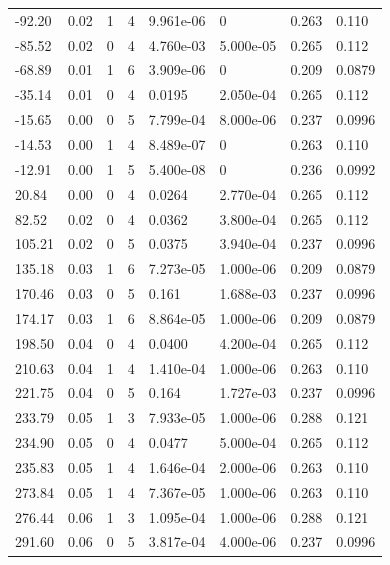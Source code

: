 \documentclass[preview]{standalone}
\begin{document}
{{\begin{tabular}{L{1.2cm}C{1.2cm} C{0.3cm}C{0.5cm} C{1.4cm}C{1.4cm} C{1.4cm}C{1.4cm}}
  -92.20  &  0.02  & 1     &  4 &  9.961e-06  & 0  & 0.263 &  0.110   \\ 
  -85.52  &  0.02  & 0     &  4 &  4.760e-03  & 5.000e-05  & 0.265 &  0.112   \\ 
  -68.89  &  0.01  & 1     &  6 &  3.909e-06  & 0  & 0.209 &  0.0879   \\ 
  -35.14  &  0.01  & 0     &  4 &  0.0195  & 2.050e-04  & 0.265 &  0.112   \\ 
  -15.65  &  0.00  & 0     &  5 &  7.799e-04  & 8.000e-06  & 0.237 &  0.0996   \\ 
  -14.53  &  0.00  & 1     &  4 &  8.489e-07  & 0  & 0.263 &  0.110   \\ 
  -12.91  &  0.00  & 1     &  5 &  5.400e-08  & 0  & 0.236 &  0.0992   \\ 
  20.84  &  0.00  & 0     &  4 &  0.0264  & 2.770e-04  & 0.265 &  0.112   \\ 
  82.52  &  0.02  & 0     &  4 &  0.0362  & 3.800e-04  & 0.265 &  0.112   \\ 
  105.21  &  0.02  & 0     &  5 &  0.0375  & 3.940e-04  & 0.237 &  0.0996   \\ 
  135.18  &  0.03  & 1     &  6 &  7.273e-05  & 1.000e-06  & 0.209 &  0.0879   \\ 
  170.46  &  0.03  & 0     &  5 &  0.161  & 1.688e-03  & 0.237 &  0.0996   \\ 
  174.17  &  0.03  & 1     &  6 &  8.864e-05  & 1.000e-06  & 0.209 &  0.0879   \\ 
  198.50  &  0.04  & 0     &  4 &  0.0400  & 4.200e-04  & 0.265 &  0.112   \\ 
  210.63  &  0.04  & 1     &  4 &  1.410e-04  & 1.000e-06  & 0.263 &  0.110   \\ 
  221.75  &  0.04  & 0     &  5 &  0.164  & 1.727e-03  & 0.237 &  0.0996   \\ 
  233.79  &  0.05  & 1     &  3 &  7.933e-05  & 1.000e-06  & 0.288 &  0.121   \\ 
  234.90  &  0.05  & 0     &  4 &  0.0477  & 5.000e-04  & 0.265 &  0.112   \\ 
  235.83  &  0.05  & 1     &  4 &  1.646e-04  & 2.000e-06  & 0.263 &  0.110   \\ 
  273.84  &  0.05  & 1     &  4 &  7.367e-05  & 1.000e-06  & 0.263 &  0.110   \\ 
  276.44  &  0.06  & 1     &  3 &  1.095e-04  & 1.000e-06  & 0.288 &  0.121   \\ 
  291.60  &  0.06  & 0     &  5 &  3.817e-04  & 4.000e-06  & 0.237 &  0.0996   \\ 

\end{tabular}}}
\end{document}
